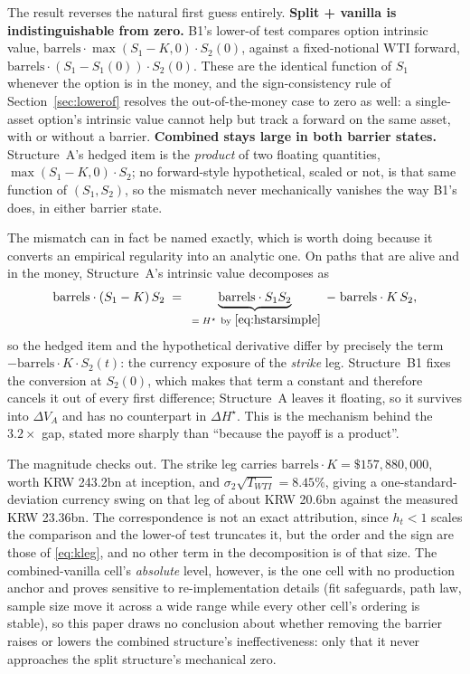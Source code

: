 \documentclass[11pt,a4paper]{article}
\begin{document}
The result reverses the natural first guess entirely. \textbf{Split + vanilla is indistinguishable from zero.} B1's lower-of test compares option intrinsic value, $\mathrm{barrels}\cdot\max(S_1-K,0)\cdot S_2(0)$, against a fixed-notional WTI forward, $\mathrm{barrels}\cdot(S_1-S_1(0))\cdot S_2(0)$. These are the identical function of $S_1$ whenever the option is in the money, and the sign-consistency rule of Section~\ref{sec:lowerof} resolves the out-of-the-money case to zero as well: a single-asset option's intrinsic value cannot help but track a forward on the same asset, with or without a barrier. \textbf{Combined stays large in both barrier states.} Structure~A's hedged item is the \emph{product} of two floating quantities, $\max(S_1-K,0)\cdot S_2$; no forward-style hypothetical, scaled or not, is that same function of $(S_1,S_2)$, so the mismatch never mechanically vanishes the way B1's does, in either barrier state.

The mismatch can in fact be named exactly, which is worth doing because it converts an empirical regularity into an analytic one. On paths that are alive and in the money, Structure~A's intrinsic value decomposes as
\begin{equation}
\mathrm{barrels}\cdot(S_1-K)\,S_2 \;=\; \underbrace{\mathrm{barrels}\cdot S_1S_2}_{\;=\;H^\star\ \text{by }\eqref{eq:hstarsimple}} \;-\; \mathrm{barrels}\cdot K\,S_2 ,
\label{eq:kleg}
\end{equation}
so the hedged item and the hypothetical derivative differ by precisely the term $-\mathrm{barrels}\cdot K\cdot S_2(t)$: the currency exposure of the \emph{strike} leg. Structure~B1 fixes the conversion at $S_2(0)$, which makes that term a constant and therefore cancels it out of every first difference; Structure~A leaves it floating, so it survives into $\Delta V_A$ and has no counterpart in $\Delta H^\star$. This is the mechanism behind the $3.2\times$ gap, stated more sharply than ``because the payoff is a product''.

The magnitude checks out. The strike leg carries $\mathrm{barrels}\cdot K=\$157{,}880{,}000$, worth KRW 243.2bn at inception, and $\sigma_2\sqrt{T_{WTI}}=8.45\%$, giving a one-standard-deviation currency swing on that leg of about KRW 20.6bn against the measured KRW 23.36bn. The correspondence is not an exact attribution, since $h_t<1$ scales the comparison and the lower-of test truncates it, but the order and the sign are those of \eqref{eq:kleg}, and no other term in the decomposition is of that size. The combined-vanilla cell's \emph{absolute} level, however, is the one cell with no production anchor and proves sensitive to re-implementation details (fit safeguards, path law, sample size move it across a wide range while every other cell's ordering is stable), so this paper draws no conclusion about whether removing the barrier raises or lowers the combined structure's ineffectiveness: only that it never approaches the split structure's mechanical zero.
\end{document}
